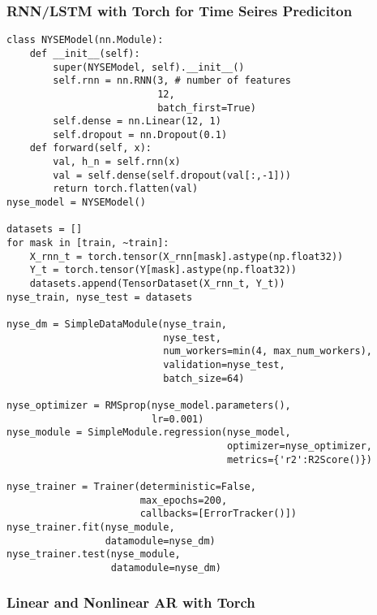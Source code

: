 \documentclass[
  letterpaper,
  DIV=11,
  numbers=noendperiod]{scrreprt}
\begin{document}
\subsubsection{RNN/LSTM with Torch for Time Seires
Prediciton}\label{rnnlstm-with-torch-for-time-seires-prediciton}

\begin{verbatim}
class NYSEModel(nn.Module):
    def __init__(self):
        super(NYSEModel, self).__init__()
        self.rnn = nn.RNN(3, # number of features
                          12,
                          batch_first=True)
        self.dense = nn.Linear(12, 1)
        self.dropout = nn.Dropout(0.1)
    def forward(self, x):
        val, h_n = self.rnn(x)
        val = self.dense(self.dropout(val[:,-1]))
        return torch.flatten(val)
nyse_model = NYSEModel()

datasets = []
for mask in [train, ~train]:
    X_rnn_t = torch.tensor(X_rnn[mask].astype(np.float32))
    Y_t = torch.tensor(Y[mask].astype(np.float32))
    datasets.append(TensorDataset(X_rnn_t, Y_t))
nyse_train, nyse_test = datasets

nyse_dm = SimpleDataModule(nyse_train,
                           nyse_test,
                           num_workers=min(4, max_num_workers),
                           validation=nyse_test,
                           batch_size=64)

nyse_optimizer = RMSprop(nyse_model.parameters(),
                         lr=0.001)
nyse_module = SimpleModule.regression(nyse_model,
                                      optimizer=nyse_optimizer,
                                      metrics={'r2':R2Score()})                           

nyse_trainer = Trainer(deterministic=False,
                       max_epochs=200,
                       callbacks=[ErrorTracker()])
nyse_trainer.fit(nyse_module,
                 datamodule=nyse_dm)
nyse_trainer.test(nyse_module,
                  datamodule=nyse_dm)
\end{verbatim}

\subsubsection{Linear and Nonlinear AR with
Torch}\label{linear-and-nonlinear-ar-with-torch}
\end{document}
